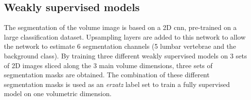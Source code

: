 \begin{multicols}{2}
\subsection*{Weakly supervised models}
\par{
    The segmentation of the volume image is based on a 2D \acrfull{cnn}, pre-trained on a large classification dataset.
    Upsampling layers are added to this network to allow the network to estimate 6 segmentation channels (5 lumbar vertebrae and the background class). 
    By training three different weakly supervised models on 3 sets of 2D images sliced along the 3 main volume dimensions, three sets of segmentation masks are obtained. 
    The combination of these different segmentation masks is used as an \textit{erzatz} label set to train a fully supervised model on one volumetric dimension.
}


\end{multicols}
